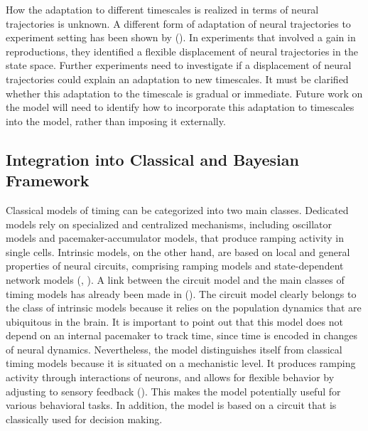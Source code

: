 \documentclass[10pt, a4paper]{article}
\begin{document}
How the adaptation to different timescales is realized in terms of neural trajectories is unknown. 
A different form of adaptation of neural trajectories to experiment setting has been shown by \citeauthor{Remington2018} (\citeyear{Remington2018}). In experiments that involved a gain in reproductions, they identified a flexible displacement of neural trajectories in the state space.
Further experiments need to investigate if a displacement of neural trajectories could explain an adaptation to new timescales. It must be clarified whether this adaptation to the timescale is gradual or immediate. 
Future work on the model will need to identify how to incorporate this adaptation to timescales into the model, rather than imposing it externally.

\subsection{Integration into Classical and Bayesian Framework}
Classical models of timing can be categorized into two main classes. 
Dedicated models rely on specialized and centralized mechanisms, including oscillator models and pacemaker-accumulator models, that produce ramping activity in single cells.
Intrinsic models, on the other hand, are based on local and general properties of neural circuits, comprising ramping models and state-dependent network models (\cite{Goel2014}, \cite{Paton2018}).
A link between the circuit model and the main classes of timing models has already been made in \citeauthor{Egger2020} (\citeyear{Egger2020}).
The circuit model clearly belongs to the class of intrinsic models because it relies on the population dynamics that are ubiquitous in the brain.
It is important to point out that this model does not depend on an internal pacemaker to track time, since time is encoded in changes of neural dynamics.  
Nevertheless, the model distinguishes itself from classical timing models because it is situated on a mechanistic level.
It produces ramping activity through interactions of neurons, and allows for flexible behavior by adjusting to sensory feedback (\cite{Egger2020}).
This makes the model potentially useful for various behavioral tasks. In addition, the model is based on a circuit that is classically used for decision making. 
\end{document}
